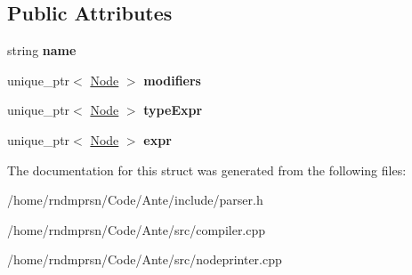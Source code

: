 \subsection*{Public Attributes}
\begin{DoxyCompactItemize}
\item 
\mbox{\label{structVarDeclNode_abca5f3a49d274a29c9e5ef9ac75289de}} 
string {\bfseries name}
\item 
\mbox{\label{structVarDeclNode_a9a55172abb2cbd1c15deb1816ef9c84a}} 
unique\+\_\+ptr$<$ \hyperlink{structNode}{Node} $>$ {\bfseries modifiers}
\item 
\mbox{\label{structVarDeclNode_a86e971c4837c67d63241a5e341423d3b}} 
unique\+\_\+ptr$<$ \hyperlink{structNode}{Node} $>$ {\bfseries type\+Expr}
\item 
\mbox{\label{structVarDeclNode_a08f1834ec9d1c7091f85eb48dd910d1a}} 
unique\+\_\+ptr$<$ \hyperlink{structNode}{Node} $>$ {\bfseries expr}
\end{DoxyCompactItemize}


The documentation for this struct was generated from the following files\+:\begin{DoxyCompactItemize}
\item 
/home/rndmprsn/\+Code/\+Ante/include/parser.\+h\item 
/home/rndmprsn/\+Code/\+Ante/src/compiler.\+cpp\item 
/home/rndmprsn/\+Code/\+Ante/src/nodeprinter.\+cpp\end{DoxyCompactItemize}

